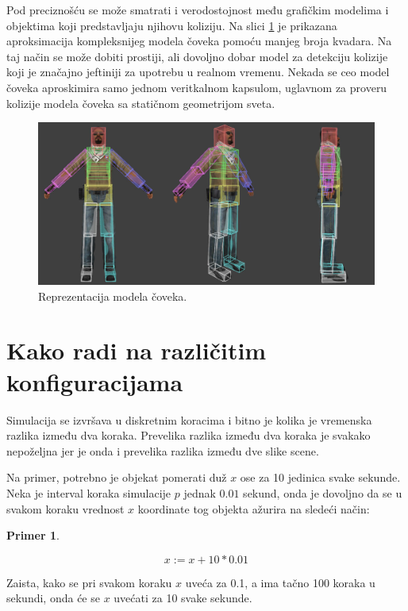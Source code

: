 \documentclass[12pt,oneside]{memoir}
\newtheorem{primer}{Primer}[section]
\begin{document}
Pod preciznošću se može smatrati i verodostojnost među grafičkim modelima i objektima koji predstavljaju njihovu koliziju.
Na slici \ref{fig:hitbox} je prikazana aproksimacija kompleksnijeg modela čoveka pomoću manjeg broja kvadara.
Na taj način se može dobiti prostiji, ali dovoljno dobar model za detekciju kolizije koji je značajno 
jeftiniji za upotrebu u realnom vremenu. 
Nekada se ceo model čoveka aproskimira samo jednom veritkalnom kapsulom, 
uglavnom za proveru kolizije modela čoveka sa statičnom geometrijom sveta. 

\begin{figure}[h!]
	\begin{center}
	\includegraphics[scale=0.55]{hitbox.png}
	\end{center}
	\caption{Reprezentacija modela čoveka.}
	\label{fig:hitbox}
\end{figure}

\section{Kako radi na različitim konfiguracijama}

Simulacija se izvršava u diskretnim koracima i bitno je kolika je vremenska razlika između dva koraka.
Prevelika razlika između dva koraka je svakako nepoželjna jer je onda i prevelika razlika između dve slike scene.

Na primer, potrebno je objekat pomerati duž $x$ ose za 10 jedinica svake sekunde. Neka je interval koraka simulacije 
$p$ jednak $0.01$ sekund, onda je dovoljno da se u svakom koraku vrednost $x$ koordinate tog objekta ažurira na sledeći način:

\begin{primer}
\label{pr:x}

$$ x:= x + 10 * 0.01 $$
\end{primer}

Zaista, kako se pri svakom koraku $x$ uveća za 0.1, a ima tačno 100 koraka u sekundi, onda će se $x$ uvećati za 10 svake sekunde.
\end{document}
